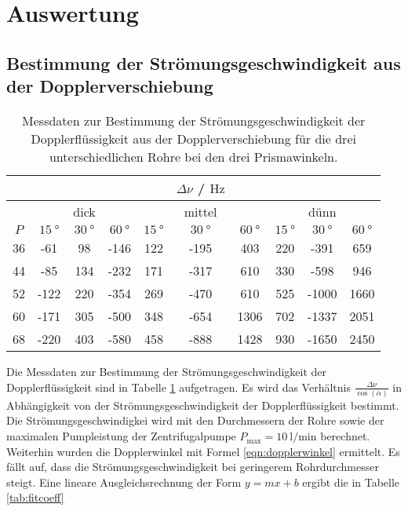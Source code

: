 \section{Auswertung}
\label{sec:Auswertung}
\subsection{Bestimmung der Strömungsgeschwindigkeit aus der Dopplerverschiebung}
\begin{table}
	\centering
	\caption{Messdaten zur Bestimmung der Strömungsgeschwindigkeit der Dopplerflüssigkeit aus der Dopplerverschiebung für die drei unterschiedlichen Rohre bei den drei Prismawinkeln.}
	\label{tab:aufgabeA}
	\begin{tabular}{cccccccccc}
		\toprule
		& & & & & $\Delta \nu$ / $\si{\hertz}$ & & & & \\
		\midrule 
		& & dick & & & mittel & & & dünn & \\
		\midrule
		$P$ & $\SI{15}{\degree}$ & $\SI{30}{\degree}$ & $\SI{60}{\degree}$ & $\SI{15}{\degree}$ & $\SI{30}{\degree}$ & $\SI{60}{\degree}$ & $\SI{15}{\degree}$ & $\SI{30}{\degree}$ & $\SI{60}{\degree}$ \\ 
		\midrule
		36 & -61 & 98 & -146 & 122 & -195 & 403 & 220 & -391 & 659 \\
		44 & -85 & 134 & -232 & 171 & -317 & 610 & 330 & -598 & 946 \\
		52 & -122 & 220 & -354 & 269 & -470 & 610 & 525 & -1000 & 1660 \\        
		60 & -171 & 305 & -500 & 348 & -654 & 1306 & 702 & -1337 & 2051 \\
		68 & -220 & 403 & -580 & 458 & -888 & 1428 & 930 & -1650 & 2450 \\
		\bottomrule
	\end{tabular}
\end{table}
Die Messdaten zur Bestimmung der Strömungsgeschwindigkeit der Dopplerflüssigkeit sind 
in Tabelle \ref{tab:aufgabeA} aufgetragen.
Es wird das Verhältnis $\frac{\Delta \nu}{\cos(\alpha)}$ in Abhängigkeit von der
Strömungsgeschwindigkeit der Dopplerflüssigkeit bestimmt. Die Strömungsgeschwindigkei
wird mit den Durchmessern der Rohre sowie der maximalen Pumpleistung der Zentrifugalpumpe 
$P_{\mathrm{max}} = \SI{10}{\litre\per\minute}$ berechnet. Weiterhin wurden die 
Dopplerwinkel mit Formel \eqref{eqn:dopplerwinkel} ermittelt.
Es fällt auf, dass die Strömungsgeschwindigkeit bei geringerem Rohrdurchmesser steigt.
Eine lineare Ausgleichsrechnung der Form $y=mx+b$ ergibt die in Tabelle \ref{tab:fitcoeff} 
